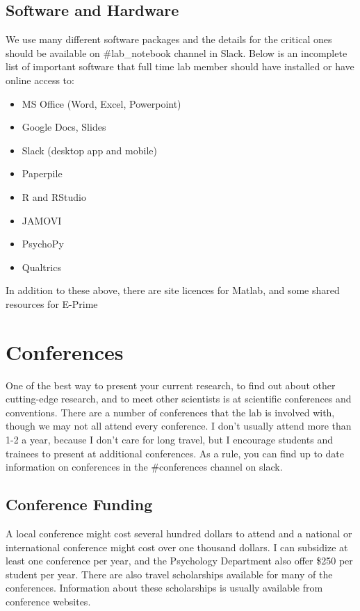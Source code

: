 \documentclass{article}
\begin{document}



\subsection{Software and Hardware}
We use many different software packages and the details for the critical ones should be available on \#lab\_notebook channel in Slack. Below is an incomplete list of important software that full time lab member should have installed or have online access to:
\begin{itemize}
\item MS Office (Word, Excel, Powerpoint)
\item Google Docs, Slides
\item Slack (desktop app and mobile)
\item Paperpile
\item R and RStudio
\item JAMOVI
\item PsychoPy
\item Qualtrics
\end{itemize}
In addition to these above, there are site licences for Matlab, and some shared resources for E-Prime


\section{Conferences}\label{sec:Conf}
One of the best way to present your current research, to find out about other cutting-edge research, and to meet other scientists is at scientific conferences and conventions. There are a number of conferences that the lab is involved with, though we may not all attend every conference. I don't usually attend more than 1-2 a year, because I don't care for long travel, but I encourage students and trainees to present at additional conferences. As a rule, you can find up to date information on conferences in the \#conferences channel on slack.

\subsection{Conference Funding}
A local conference might cost several hundred dollars to attend and a national or international conference might cost over one thousand dollars. I can subsidize at least one conference per year, and the Psychology Department also offer \$250 per student per year. There are also travel scholarships available for many of the conferences. Information about these scholarships is usually available from conference websites. 
\end{document}
